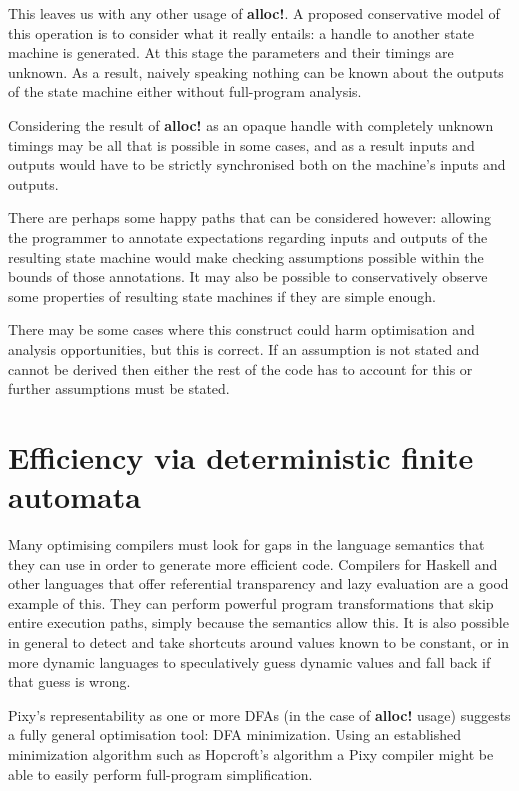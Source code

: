 \documentclass{scrartcl}
\begin{document}
    This leaves us with any other usage of \textbf{alloc!}. A proposed conservative model of this operation is to consider what it really entails: a handle to another state machine is generated. At this stage the parameters and their timings are unknown. As a result, naively speaking nothing can be known about the outputs of the state machine either without full-program analysis.
    
    Considering the result of \textbf{alloc!} as an opaque handle with completely unknown timings may be all that is possible in some cases, and as a result inputs and outputs would have to be strictly synchronised both on the machine's inputs and outputs.
    
    There are perhaps some happy paths that can be considered however: allowing the programmer to annotate expectations regarding inputs and outputs of the resulting state machine would make checking assumptions possible within the bounds of those annotations. It may also be possible to conservatively observe some properties of resulting state machines if they are simple enough.
    
    There may be some cases where this construct could harm optimisation and analysis opportunities, but this is correct. If an assumption is not stated and cannot be derived then either the rest of the code has to account for this or further assumptions must be stated.

    \section{Efficiency via deterministic finite automata}
    
    \label{sec:efficiency}
    
    Many optimising compilers must look for gaps in the language semantics that they can use in order to generate more efficient code. Compilers for Haskell and other languages that offer referential transparency and lazy evaluation are a good example of this. They can perform powerful program transformations that skip entire execution paths, simply because the semantics allow this. It is also possible in general to detect and take shortcuts around values known to be constant, or in more dynamic languages to speculatively guess dynamic values and fall back if that guess is wrong.
    
    Pixy's representability as one or more DFAs (in the case of \textbf{alloc!} usage) suggests a fully general optimisation tool: DFA minimization\cite{dfamin}. Using an established minimization algorithm such as Hopcroft's algorithm a Pixy compiler might be able to easily perform  full-program simplification.
    
\end{document}
